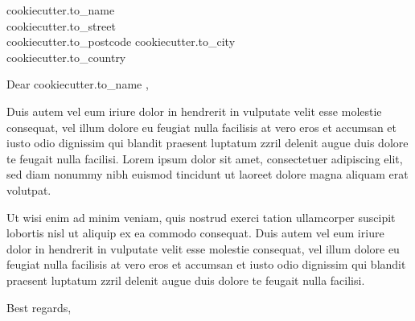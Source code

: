 \documentclass[fontsize=10pt]{scrlttr2}
\begin{document}
\begin{letter}{ 
{{ cookiecutter.to_name }} \\
{{ cookiecutter.to_street }} \\
{{ cookiecutter.to_postcode }} 
{{ cookiecutter.to_city }} \\
{{ cookiecutter.to_country }}
} 

\opening{Dear {{ cookiecutter.to_name }},}

Duis autem vel eum iriure dolor in hendrerit in vulputate velit esse molestie consequat, vel illum dolore eu feugiat nulla facilisis at vero eros et accumsan et iusto odio dignissim qui blandit praesent luptatum zzril delenit augue duis dolore te feugait nulla facilisi. Lorem ipsum dolor sit amet, consectetuer adipiscing elit, sed diam nonummy nibh euismod tincidunt ut laoreet dolore magna aliquam erat volutpat.   

Ut wisi enim ad minim veniam, quis nostrud exerci tation ullamcorper suscipit lobortis nisl ut aliquip ex ea commodo consequat. Duis autem vel eum iriure dolor in hendrerit in vulputate velit esse molestie consequat, vel illum dolore eu feugiat nulla facilisis at vero eros et accumsan et iusto odio dignissim qui blandit praesent luptatum zzril delenit augue duis dolore te feugait nulla facilisi.   

\closing{Best regards,}
\end{letter}
\end{document}
